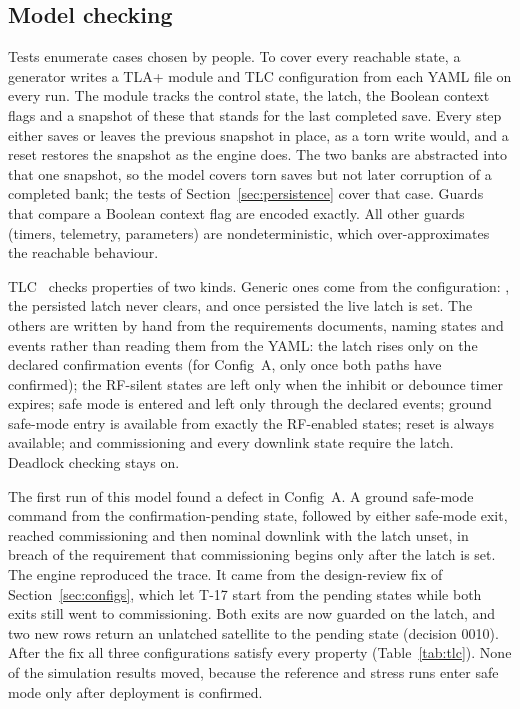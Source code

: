 \documentclass[preprint,12pt]{elsarticle}
\newcommand{\cfgA}{Config~A}
\begin{document}
\subsection{Model checking}\label{sec:mc}

Tests enumerate cases chosen by people. To cover every reachable state, a generator writes a TLA+ module and TLC configuration from each YAML file on every run. The module tracks the control state, the latch, the Boolean context flags and a snapshot of these that stands for the last completed save. Every step either saves or leaves the previous snapshot in place, as a torn write would, and a reset restores the snapshot as the engine does. The two banks are abstracted into that one snapshot, so the model covers torn saves but not later corruption of a completed bank; the tests of Section~\ref{sec:persistence} cover that case. Guards that compare a Boolean context flag are encoded exactly. All other guards (timers, telemetry, parameters) are nondeterministic, which over-approximates the reachable behaviour.

TLC~\cite{Yu1999TLC} checks properties of two kinds. Generic ones come from the configuration: , the persisted latch never clears, and once persisted the live latch is set. The others are written by hand from the requirements documents, naming states and events rather than reading them from the YAML: the latch rises only on the declared confirmation events (for \cfgA{}, only once both paths have confirmed); the RF-silent states are left only when the inhibit or debounce timer expires; safe mode is entered and left only through the declared events; ground safe-mode entry is available from exactly the RF-enabled states; reset is always available; and commissioning and every downlink state require the latch. Deadlock checking stays on.

The first run of this model found a defect in \cfgA{}. A ground safe-mode command from the confirmation-pending state, followed by either safe-mode exit, reached commissioning and then nominal downlink with the latch unset, in breach of the requirement that commissioning begins only after the latch is set. The engine reproduced the trace. It came from the design-review fix of Section~\ref{sec:configs}, which let T-17 start from the pending states while both exits still went to commissioning. Both exits are now guarded on the latch, and two new rows return an unlatched satellite to the pending state (decision 0010). After the fix all three configurations satisfy every property (Table~\ref{tab:tlc}). None of the simulation results moved, because the reference and stress runs enter safe mode only after deployment is confirmed.
\end{document}
